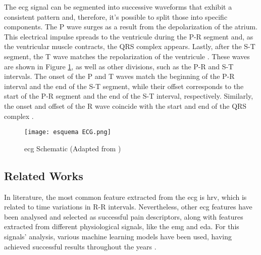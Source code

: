 The \ac{ecg} signal can be segmented into successive waveforms that exhibit a consistent pattern and, therefore, it's possible to split those into specific components. The P wave surges as a result from the depolarization of the atrium. This electrical impulse spreads to the ventricule during the P-R segment and, as the ventricular muscle contracts, the QRS complex appears. Lastly, after the S-T segment, the T wave matches the repolarization of the ventricule \cite{hampton2024ecg}. These waves are shown in Figure \ref{fig:esquemaecg}, as well as other divisions, such as the P-R and S-T intervals. The onset of the P and T waves match the beginning of the P-R interval and the end of the S-T segment, while their offset corresponds to the start of the P-R segment and the end of the S-T interval, respectively. Similarly, the onset and offset of the R wave coincide with the start and end of the QRS complex \cite{Zhang2024}.

\begin{figure}[h!]
    \centering
    \texttt{[image: esquema ECG.png]}
    \caption{\ac{ecg} Schematic (Adapted from \cite{Dogan2023})}
    \label{fig:esquemaecg}
\end{figure}


\subsection{Related Works}


In literature, the most common feature extracted from the \ac{ecg} is \ac{hrv}, which is related to time variations in R-R intervals. Nevertheless, other \ac{ecg} features have been analysed and selected as successful pain descriptors, along with features extracted from different physiological signals, like the \ac{emg} and \ac{eda}. For this signals' analysis, various machine learning models have been used, having achieved successful results throughout the years \cite{Moscato2022}\cite{Pais2025}.

